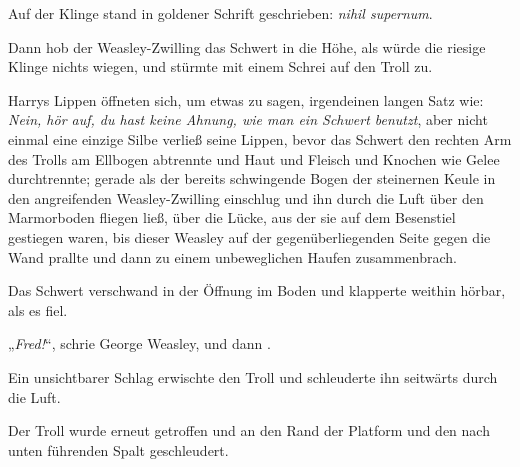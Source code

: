 Auf der Klinge stand in goldener Schrift geschrieben: \emph{nihil supernum}.

Dann hob der Weasley-Zwilling das Schwert in die Höhe, als würde die riesige Klinge nichts wiegen, und stürmte mit einem Schrei auf den Troll zu.

Harrys Lippen öffneten sich, um etwas zu sagen, irgendeinen langen Satz wie: \emph{Nein, hör auf, du hast keine Ahnung, wie man ein Schwert benutzt}, aber nicht einmal eine einzige Silbe verließ seine Lippen, bevor das Schwert den rechten Arm des Trolls am Ellbogen abtrennte und Haut und Fleisch und Knochen wie Gelee durchtrennte; gerade als der bereits schwingende Bogen der steinernen Keule in den angreifenden Weasley-Zwilling einschlug und ihn durch die Luft über den Marmorboden fliegen ließ, über die Lücke, aus der sie auf dem Besenstiel gestiegen waren, bis dieser Weasley auf der gegenüberliegenden Seite gegen die Wand prallte und dann zu einem unbeweglichen Haufen zusammenbrach.

Das Schwert verschwand in der Öffnung im Boden und klapperte weithin hörbar, als es fiel.

„\emph{Fred!}“, schrie George Weasley, und dann .

Ein unsichtbarer Schlag erwischte den Troll und schleuderte ihn seitwärts durch die Luft.


Der Troll wurde erneut getroffen und an den Rand der Platform und den nach unten führenden Spalt geschleudert.

